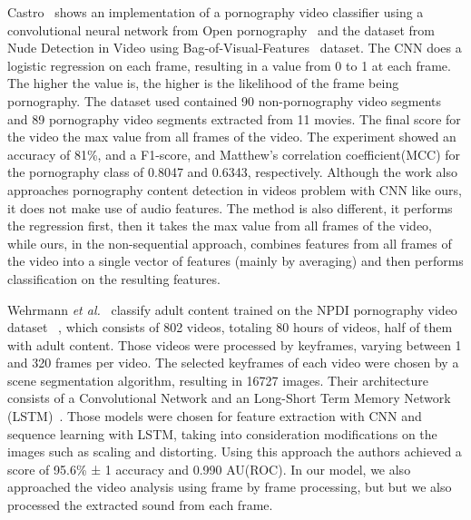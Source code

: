 Castro~\cite{torres2018automatic} shows an implementation of a pornography video classifier using a convolutional neural network from Open pornography~\cite{mahadeokar2016open} and the dataset from Nude Detection in Video using Bag-of-Visual-Features~\cite{lopes2009nude} dataset.
The CNN does a logistic regression on each frame, resulting in a value from 0 to 1 at each frame.
The higher the value is, the higher is the likelihood of the frame being pornography.
The dataset used contained 90 non-pornography video segments and 89 pornography video segments extracted from 11 movies.
The final score for the video the max value from all frames of the video.
The experiment showed an accuracy of 81\%, and a F1-score, and Matthew’s correlation coefficient(MCC) for the pornography class of 0.8047 and 0.6343, respectively.
Although the work also approaches pornography content detection in videos problem with CNN like ours, it does not make use of audio features.
The method is also different, it performs the regression first, then it takes the max value from all frames of the video, while ours, in the non-sequential approach, combines features from all frames of the video into a single vector of features (mainly by averaging) and then performs classification on the resulting features.

Wehrmann \textit{et al.}~\cite{wehrmann2018adult} classify adult content trained on the NPDI pornography video dataset ~\cite{avila2013pooling}, which consists of 802 videos, totaling 80 hours of videos, half of them with adult content.
Those videos were processed by keyframes, varying between 1 and 320 frames per video.
The selected keyframes of each video were chosen by a scene segmentation algorithm, resulting in 16727 images. %
Their architecture consists of a Convolutional Network and an Long-Short Term Memory Network (LSTM)~\cite{hochreiter1997long}.
Those models were chosen for feature extraction with CNN and sequence learning with LSTM, taking into consideration modifications on the images such as scaling and distorting.
Using this approach the authors achieved a score of 95.6\% ± 1 accuracy and 0.990 AU(ROC).
In our model, we also approached the video analysis using frame by frame processing, but but we also processed the extracted sound from each frame.%

